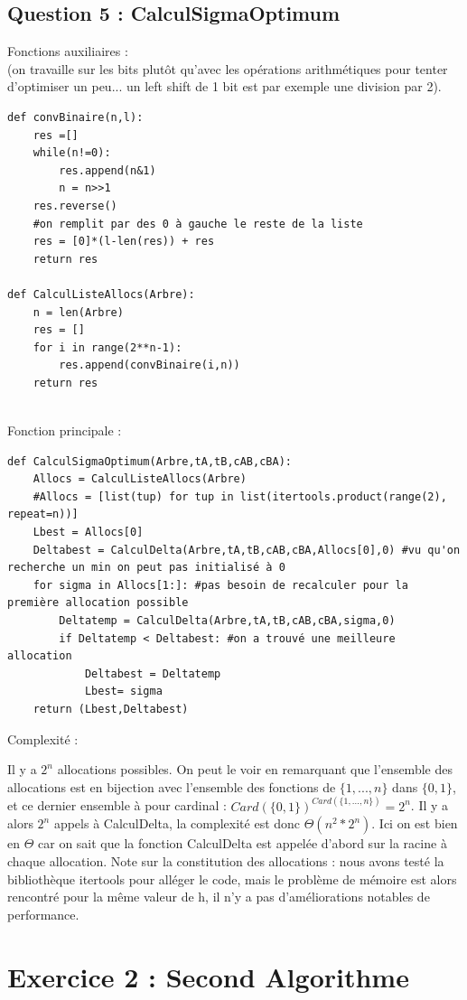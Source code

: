 \documentclass{article}
\begin{document}
\subsection{Question 5 : CalculSigmaOptimum}
Fonctions auxiliaires :\\
(on travaille sur les bits plutôt qu'avec les opérations arithmétiques pour tenter d'optimiser un peu... un left shift de 1 bit est par exemple une division par 2).
\begin{lstlisting}
def convBinaire(n,l):
    res =[]
    while(n!=0):
        res.append(n&1)
        n = n>>1
    res.reverse()
    #on remplit par des 0 à gauche le reste de la liste
    res = [0]*(l-len(res)) + res
    return res
    
def CalculListeAllocs(Arbre):
    n = len(Arbre)
    res = []
    for i in range(2**n-1):
        res.append(convBinaire(i,n))
    return res
    
\end{lstlisting}
Fonction principale :
\begin{lstlisting}
def CalculSigmaOptimum(Arbre,tA,tB,cAB,cBA):
    Allocs = CalculListeAllocs(Arbre)
    #Allocs = [list(tup) for tup in list(itertools.product(range(2), repeat=n))]
    Lbest = Allocs[0]
    Deltabest = CalculDelta(Arbre,tA,tB,cAB,cBA,Allocs[0],0) #vu qu'on recherche un min on peut pas initialisé à 0
    for sigma in Allocs[1:]: #pas besoin de recalculer pour la première allocation possible
        Deltatemp = CalculDelta(Arbre,tA,tB,cAB,cBA,sigma,0)
        if Deltatemp < Deltabest: #on a trouvé une meilleure allocation
            Deltabest = Deltatemp
            Lbest= sigma
    return (Lbest,Deltabest)
\end{lstlisting}

Complexité : 

Il y a $2^n$ allocations possibles. On peut le voir en remarquant que l'ensemble des allocations est en bijection avec l'ensemble des fonctions de $\{1,...,n\}$ dans $\{0,1\}$, et ce dernier ensemble à pour cardinal : $Card(\{0,1\})^{Card(\{1,...,n\})}=2^n$.
Il y a alors $2^n$ appels à CalculDelta, la complexité est donc $\Theta(n^2*2^n)$. Ici on est bien en $\Theta$ car on sait que la fonction CalculDelta est appelée d'abord sur la racine à chaque allocation. 
Note sur la constitution des allocations : nous avons testé la bibliothèque itertools pour alléger le code, mais le problème de mémoire est alors rencontré pour la même valeur de h, il n'y a pas d'améliorations notables de performance.


\section{Exercice 2 : Second Algorithme}
\end{document}
